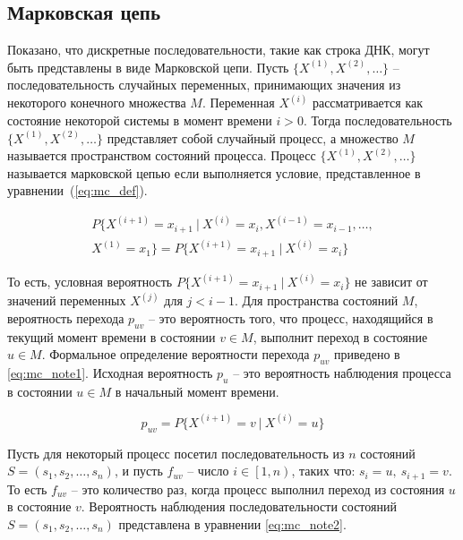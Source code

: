 \subsection{Марковская цепь}

Показано\cite{17_heath2021computing}, что дискретные последовательности, такие как строка ДНК, могут быть представлены в виде Марковской цепи. Пусть $ \{X^{\left(1\right)},X^{\left(2\right)},\ldots\} $ -- последовательность случайных переменных, принимающих значения из некоторого конечного множества $ M $. Переменная $ X^{\left(i\right)} $ рассматривается как состояние некоторой системы в момент времени $ i > 0 $. Тогда последовательность $ \{X^{\left(1\right)},X^{\left(2\right)},\ldots\} $ представляет собой случайный процесс, а множество $ M $ называется пространством состояний процесса. Процесс $ \{X^{\left(1\right)},X^{\left(2\right)},\ldots\} $ называется марковской цепью\cite{14_billingsley1961statistical} если выполняется условие, представленное в уравнении~(\ref{eq:mc_def}).

\begin{equation}
	\begin{split}
		P\{X^{\left(i+1\right)}=x_{i+1}\ \vert \ X^{\left(i\right)}=x_i,X^{\left(i-1\right)}=x_{i-1},\ldots, \\
		X^{\left(1\right)}=x_1\}=P\{X^{\left(i+1\right)}=x_{i+1}\ \vert \ X^{\left(i\right)}=x_i\}
	\end{split}
	\label{eq:mc_def}
\end{equation}

То есть, условная вероятность $ P\{X^{\left(i+1\right)}=x_{i+1}\ \vert \ X^{\left(i\right)}=x_i\} $ не зависит от значений переменных $ X^{\left(j\right)} $ для $ j<i-1 $. Для пространства состояний $ M $, вероятность перехода $ p_{uv} $ -- это вероятность того, что процесс, находящийся в текущий момент времени в состоянии  $ v \in M $, выполнит переход в состояние $ u \in M $. Формальное определение вероятности перехода $ p_{uv} $ приведено в \ref{eq:mc_note1}. Исходная вероятность $ p_u $ -- это вероятность наблюдения процесса в состоянии $ u \in M $ в начальный момент времени.

\begin{equation}
	p_{uv}=P\{X^{\left(i+1\right)}=v\ \vert \ X^{\left(i\right)}=u\}
	\label{eq:mc_note1}
\end{equation}

Пусть для некоторый процесс посетил последовательность из $ n $ состояний $ S=\left(s_1,s_2,\ldots,s_n\right) $, и пусть $ f_{uv} $ -- число $ i\in\left[1,n\right) $, таких что: $ s_i=u,\ s_{i+1}=v $. То есть $ f_{uv} $ -- это количество раз, когда процесс выполнил переход из состояния $ u $ в состояние $ v $. Вероятность наблюдения последовательности состояний $ S=\left(s_1,s_2,\ldots,s_n\right) $ представлена в уравнении \ref{eq:mc_note2}.

